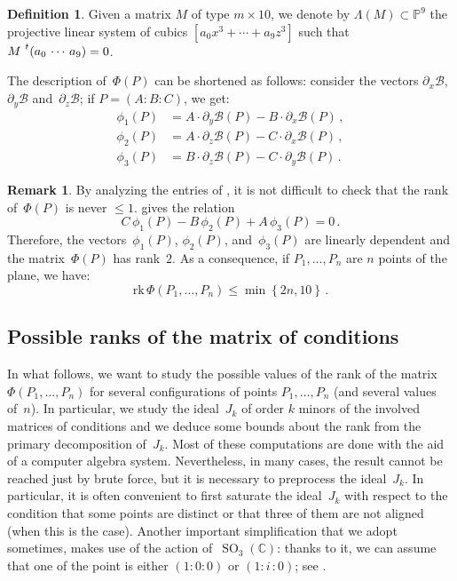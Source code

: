 \documentclass[a4paper, 11pt, reqno]{amsart}
\theoremstyle{plain}
\theoremstyle{definition}
\newtheorem{definition}[lemma]{Definition}
\newtheorem{rmk}[lemma]{Remark}
\newcommand{\C}{\mathbb{C}}
\newcommand{\p}{\mathbb{P}}
\newcommand{\de}{\partial}
\newcommand{\iii}{\textit{i}\,}
\newcommand{\rk}{\ensuremath{\mathrm{rk}}}
\newcommand{\SO}{\operatorname{SO}}
\begin{document}
\begin{definition}
Given a matrix $M$ of type $m \times 10$, we denote by $\Lambda(M) \subset \p^9$ the projective linear system of cubics $[a_0 x^3 + \dotsb + a_9 z^3]$ such that $M \, \prescript{t}{}{\left( a_0 \,  \cdots \,  a_9 \right)} = 0$.
\end{definition}

The description of~$\Phi(P)$ can be shortened as follows: consider the vectors $\de_x \mathcal{B}$,
$\de_y \mathcal{B}$ and~$\de_z \mathcal{B}$;
if $P=(A: B: C)$, we get:
%
\begin{equation}
\label{eq:vector_conditions}
  \begin{aligned}
    \phi_1(P) &= A\cdot \de_y \mathcal{B}(P) - B\cdot \de_x \mathcal{B}(P) \,, \\
    \phi_2(P) &= A\cdot \de_z \mathcal{B}(P) - C\cdot \de_x \mathcal{B}(P) \,, \\
    \phi_3(P) &= B\cdot \de_z \mathcal{B}(P) - C\cdot \de_y \mathcal{B}(P) \,.
  \end{aligned}
\end{equation}
%
\begin{rmk}
\label{remark:rank_2}
By analyzing the entries of , it is not difficult to check that the rank of~$\Phi(P)$ is never $\leq 1$.  gives the relation
%
\begin{equation}
\label{eq:syzygy}
  C \, \phi_1(P) - B \, \phi_2(P) + A \, \phi_3(P) = 0 \,.
\end{equation}
%
Therefore, the vectors~$\phi_1(P)$, $\phi_2(P)$, and~$\phi_3(P)$ are linearly dependent and the matrix~$\Phi(P)$ has rank~$2$.
As a consequence, if $P_1, \dots, P_n$ are $n$ points of the plane, we have:
%
\[
  \rk \,\Phi(P_1, \dots, P_n) \leq \min \left\{2n, 10 \right\} \,.
\]
%
\end{rmk}

\subsection{Possible ranks of the matrix of conditions}

In what follows, we want to study the possible values of the rank of the matrix
$\Phi(P_1, \dots, P_n)$ for several configurations of points $P_1, \dots, P_n$
(and several values of~$n$).
In particular, we study the ideal~$J_k$ of order $k$ minors of the
involved matrices of conditions and we deduce some bounds about the rank from the primary
decomposition of~$J_k$. 
Most of these computations are done with the aid of a computer algebra system.
Nevertheless, in many cases, the result cannot be reached just by brute force, 
but it is necessary to preprocess the ideal~$J_k$. 
In particular, it is often convenient to first saturate the ideal~$J_k$ with respect to
the condition that some points are distinct or that three of them are not aligned 
(when this is the case). 
Another important simplification that we adopt sometimes, makes use
of the action of~$\SO_3(\C)$: thanks to it, we can assume that one of
the point is either $(1: 0: 0)$ or $(1: \iii: 0)$; see .
\end{document}
